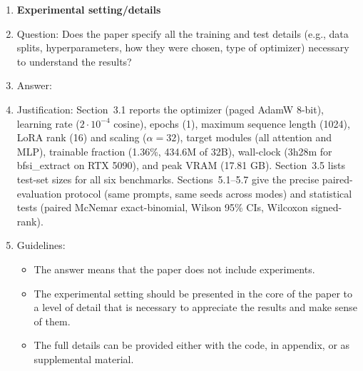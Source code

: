 \begin{enumerate}
\item {\bf Experimental setting/details}
    \item[] Question: Does the paper specify all the training and test details (e.g., data splits, hyperparameters, how they were chosen, type of optimizer) necessary to understand the results?
    \item[] Answer: \answerYes{}
    \item[] Justification: Section~3.1 reports the optimizer (paged AdamW 8-bit), learning rate ($2{\cdot}10^{-4}$ cosine), epochs (1), maximum sequence length (1024), LoRA rank (16) and scaling ($\alpha{=}32$), target modules (all attention and MLP), trainable fraction (1.36\%, 434.6M of 32B), wall-clock (3h28m for bfsi\_extract on RTX 5090), and peak VRAM (17.81 GB). Section~3.5 lists test-set sizes for all six benchmarks. Sections~5.1--5.7 give the precise paired-evaluation protocol (same prompts, same seeds across modes) and statistical tests (paired McNemar exact-binomial, Wilson 95\% CIs, Wilcoxon signed-rank).
    \item[] Guidelines:
    \begin{itemize}
        \item The answer \answerNA{} means that the paper does not include experiments.
        \item The experimental setting should be presented in the core of the paper to a level of detail that is necessary to appreciate the results and make sense of them.
        \item The full details can be provided either with the code, in appendix, or as supplemental material.
    \end{itemize}


\end{enumerate}
